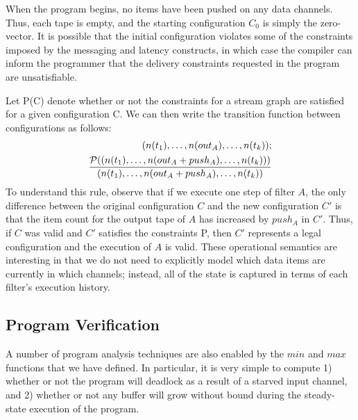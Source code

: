 When the program begins, no items have been pushed on any data
channels.  Thus, each tape is empty, and the starting configuration
$C_0$ is simply the zero-vector.  It is possible that the initial
configuration violates some of the constraints imposed by the
messaging and latency constructs, in which case the compiler can
inform the programmer that the delivery constraints requested in the
program are unsatisfiable.

Let {\cal P}(C) denote whether or not the constraints for a stream
graph are satisfied for a given configuration C.  We can then write
the transition function between configurations as follows:
\begin{align*}
(n(t_1), \dots , n(out_A), \dots, n(t_k)); \\ \frac{{\cal P}((n(t_1), \dots , n(out_A + push_A), \dots, n(t_k)))}{(n(t_1), \dots , n(out_A + push_A), \dots, n(t_k))}
\end{align*}
To understand this rule, observe that if we execute one step of filter
$A$, the only difference between the original configuration $C$ and
the new configuration $C'$ is that the item count for the output tape
of $A$ has increased by $push_A$ in $C'$.  Thus, if $C$ was valid and
$C'$ satisfies the constraints {\cal P}, then $C'$ represents a legal
configuration and the execution of $A$ is valid.  These operational
semantics are interesting in that we do not need to explicitly model
which data items are currently in which channels; instead, all of the
state is captured in terms of each filter's execution history.

\subsection{Program Verification}

A number of program analysis techniques are also enabled by the $min$
and $max$ functions that we have defined.  In particular, it is very
simple to compute 1) whether or not the program will deadlock as a
result of a starved input channel, and 2) whether or not any buffer
will grow without bound during the steady-state execution of the
program.

